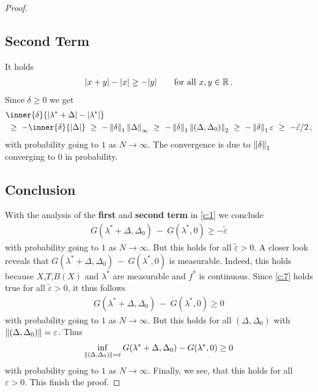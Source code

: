 \begin{proof}
\subsection*{Second Term}
It holds
\begin{gather*}
  |x+y|-|x|\ge
  -|y|
  \qquad
  \text{for all}\ 
  x,y\in\R
  \,.
\end{gather*}
Since
$\delta\ge 0$
we get
\begin{align*}
  &
     \inner
     {\delta}
     {
       |\lambda^*+\Delta|
       -
       |\lambda^*|
     }
     \\
     &
     \ 
     \ge
     \ 
     -
     \inner{\delta}
     {|\Delta|}
     \ 
     \ge
     \ 
     -
     \norm{\delta}_1
     \norm{\Delta}_\infty
     \ 
     \ge
     \ 
     -
     \norm{\delta}_1
     \norm{(\Delta,\Delta_0)}_2
     \ 
     \ge
     \ 
     -
     \norm{\delta}_1
     \varepsilon
     \ 
     \ge
     \ 
     -
     \tilde{\varepsilon}/2
     \,,
\end{align*}
with probability going to $1$ as $N\to \infty$.
The convergence is due to $\left\lVert\delta\right\rVert_1$ converging to $0$ in probability.
\subsection*{Conclusion}
With the analysis of the \textbf{first} and \textbf{second term} in
\eqref{c:1} we conclude
\begin{gather}
  \label{c:7}
  G
     (
     \lambda^*
      +
      \Delta
      ,
     \Delta_0
     )
     \ 
     -
     \ 
     G
     (
     \lambda^*,
     0
     )
     \ge
     -
     \tilde{\varepsilon}
\end{gather}
with probability going to $1$ as $N\to \infty$.
But this holds for all $\tilde{\varepsilon}>0$.
A closer look reveals that
$
  G
     (
     \lambda^*
      +
      \Delta
      ,
     \Delta_0
     )
     \ 
     -
     \ 
     G
     (
     \lambda^*,
     0
     )
$ 
is measurable.
Indeed, this holds because $X$,$T$,$B(X)$ and $\lambda^*$ are measurable and $f^*$ is continuous.
Since \eqref{c:7} holds true for all $\tilde{\varepsilon}>0$, it thus follows 
\begin{gather}
  G
     (
     \lambda^*
      +
      \Delta
      ,
     \Delta_0
     )
     \ 
     -
     \ 
     G
     (
     \lambda^*,
     0
     )
     \ge
     0
\end{gather}
with probability going to $1$ as $N\to \infty$.
But this holds for all 
$
(\Delta,\Delta_0)
$
with 
$
\left\lVert
(\Delta,\Delta_0)
\right\rVert
=\varepsilon
$. Thus
\begin{gather}
   \inf _ { 
       \left\lVert
         (
     \Delta
     ,
     \Delta_0
         )
 \right\rVert 
= \varepsilon }
     G
     (
     \lambda^*
      +
      \Delta
      ,
     \Delta_0
     )
     -
     G
     (
     \lambda^*,
     0
     )
     \ge 
     0
\end{gather}
with probability going to $1$ as $N\to \infty$.
Finally, we see, that this holds for all $\varepsilon>0$. This finish the proof.
 \end{proof}

